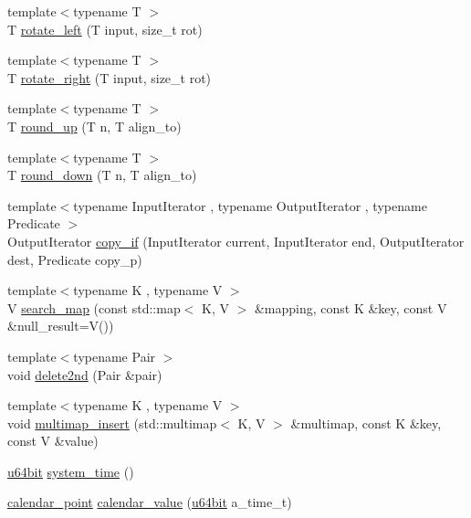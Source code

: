 \begin{DoxyCompactItemize}
\item 
{\footnotesize template$<$typename T $>$ }\\T \hyperlink{namespaceBotan_a6ad6271f1241d151d1fe3a1af743779c}{rotate\-\_\-left} (T input, size\-\_\-t rot)
\item 
{\footnotesize template$<$typename T $>$ }\\T \hyperlink{namespaceBotan_a61ca235c27bdd517ad57cb4aceedc293}{rotate\-\_\-right} (T input, size\-\_\-t rot)
\item 
{\footnotesize template$<$typename T $>$ }\\T \hyperlink{namespaceBotan_a2d388aff48dd00301d31b6514b45b985}{round\-\_\-up} (T n, T align\-\_\-to)
\item 
{\footnotesize template$<$typename T $>$ }\\T \hyperlink{namespaceBotan_a739284d09cfe6d92de51a31282a43ead}{round\-\_\-down} (T n, T align\-\_\-to)
\item 
{\footnotesize template$<$typename Input\-Iterator , typename Output\-Iterator , typename Predicate $>$ }\\Output\-Iterator \hyperlink{namespaceBotan_a5c122cf7bd816f844459462402c3b6ec}{copy\-\_\-if} (Input\-Iterator current, Input\-Iterator end, Output\-Iterator dest, Predicate copy\-\_\-p)
\item 
{\footnotesize template$<$typename K , typename V $>$ }\\V \hyperlink{namespaceBotan_a858054ae4327d92f5e308fd10e9d751b}{search\-\_\-map} (const std\-::map$<$ K, V $>$ \&mapping, const K \&key, const V \&null\-\_\-result=V())
\item 
{\footnotesize template$<$typename Pair $>$ }\\void \hyperlink{namespaceBotan_a814b72ea0b22ac9d4ffb9f1963149403}{delete2nd} (Pair \&pair)
\item 
{\footnotesize template$<$typename K , typename V $>$ }\\void \hyperlink{namespaceBotan_aab0b92bc1b95cf67b1367760c054c45d}{multimap\-\_\-insert} (std\-::multimap$<$ K, V $>$ \&multimap, const K \&key, const V \&value)
\item 
\hyperlink{namespaceBotan_a634063d9fb05e25262ca94ed927030f6}{u64bit} \hyperlink{namespaceBotan_a720821a70d6f86b29444bac48ff76bd6}{system\-\_\-time} ()
\item 
\hyperlink{structBotan_1_1calendar__point}{calendar\-\_\-point} \hyperlink{namespaceBotan_a72615869e0cfc1034885395d3dbbc908}{calendar\-\_\-value} (\hyperlink{namespaceBotan_a634063d9fb05e25262ca94ed927030f6}{u64bit} a\-\_\-time\-\_\-t)

\end{DoxyCompactItemize}
